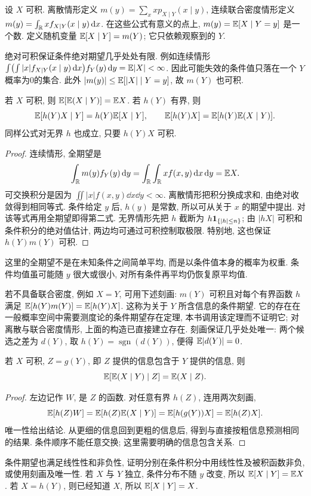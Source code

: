 \begin{definition}
设 $X$ 可积. 离散情形定义
$m(y)=\sum_x xp_{X\mid Y}(x\mid y)$, 连续联合密度情形定义
$m(y)=\int_\mathbb R xf_{X\mid Y}(x\mid y)\,\mathrm d x$.
在这些公式有意义的点上, $m(y)=\mathbb E[X\mid Y=y]$ 是一个数. 定义随机变量
$\mathbb E[X\mid Y]=m(Y)$; 它只依赖观察到的 $Y$.
\end{definition}
绝对可积保证条件绝对期望几乎处处有限. 例如连续情形
$\int\bigl(\int |x|f_{X\mid Y}(x\mid y)\,\mathrm d x\bigr)f_Y(y)\,\mathrm d y=\mathbb E|X|<\infty$.
因此可能失效的条件值只落在一个 $Y$ 概率为0的集合. 此外 $|m(y)|\le\mathbb E[|X|\mid Y=y]$, 故 $m(Y)$ 也可积.

\begin{theorem}[全期望与拉出已知因子]
若 $X$ 可积, 则 $\mathbb E[\mathbb E(X\mid Y)]=\mathbb E X$. 若 $h(Y)$ 有界, 则
\[\mathbb E[h(Y)X\mid Y]=h(Y)\mathbb E[X\mid Y],\qquad
\mathbb E[h(Y)X]=\mathbb E[h(Y)\mathbb E(X\mid Y)].\]
同样公式对无界 $h$ 也成立, 只要 $h(Y)X$ 可积.
\end{theorem}
\begin{proof}
连续情形, 全期望是
\[
\int_\mathbb R m(y)f_Y(y)\,\mathrm d y
=\int_\mathbb R\int_\mathbb R xf(x,y)\,\mathrm d x\,\mathrm d y=\mathbb E X.
\]
可交换积分是因为 $\iint |x|f(x,y)\dd x\dd y<\infty$. 离散情形把积分换成求和, 由绝对收敛得到相同等式. 条件给定 $y$ 后, $h(y)$ 是常数, 所以可从关于 $x$ 的期望中提出. 对该等式再用全期望即得第二式. 无界情形先把 $h$ 截断为 $h\mathbf 1_{\{|h|\le n\}}$; 由 $|hX|$ 可积和条件积分的绝对值估计, 两边均可通过可积控制取极限. 特别地, 这也保证 $h(Y)m(Y)$ 可积.
\end{proof}
这里的全期望不是在未知条件之间简单平均, 而是以条件值本身的概率为权重. 条件均值虽可能随 $y$ 很大或很小, 对所有条件再平均仍恢复原平均值.

若不具备联合密度, 例如 $X=Y$, 可用下述刻画: $m(Y)$ 可积且对每个有界函数 $h$ 满足
$\mathbb E[h(Y)m(Y)]=\mathbb E[h(Y)X]$. 这称为关于 $Y$ 所含信息的条件期望. 它的存在在一般概率空间中需要测度论的条件期望存在定理, 本书调用该定理而不证明它; 对离散与联合密度情形, 上面的构造已直接建立存在. 刻画保证几乎处处唯一: 两个候选之差为 $d(Y)$, 取 $h(Y)=\operatorname{sgn}(d(Y))$, 便得 $\mathbb E|d(Y)|=0$.

\begin{proposition}[塔式性质]
若 $X$ 可积, $Z=g(Y)$, 即 $Z$ 提供的信息包含于 $Y$ 提供的信息, 则
\[\mathbb E[\mathbb E(X\mid Y)\mid Z]=\mathbb E(X\mid Z).\]
\end{proposition}
\begin{proof}
左边记作 $W$, 是 $Z$ 的函数. 对任意有界 $h(Z)$, 连用两次刻画,
\[\mathbb E[h(Z)W]=\mathbb E[h(Z)\mathbb E(X\mid Y)]=\mathbb E[h(g(Y))X]=\mathbb E[h(Z)X].\]
唯一性给出结论. 从更细的信息回到更粗的信息后, 得到与直接按粗信息预测相同的结果. 条件顺序不能任意交换; 这里需要明确的信息包含关系.
\end{proof}
条件期望也满足线性性和非负性, 证明分别在条件积分中用线性性及被积函数非负, 或使用刻画及唯一性. 若 $X$ 与 $Y$ 独立, 条件分布不随 $y$ 改变, 所以 $\mathbb E[X\mid Y]=\mathbb E X$. 若 $X=h(Y)$, 则已经知道 $X$, 所以 $\mathbb E[X\mid Y]=X$.

